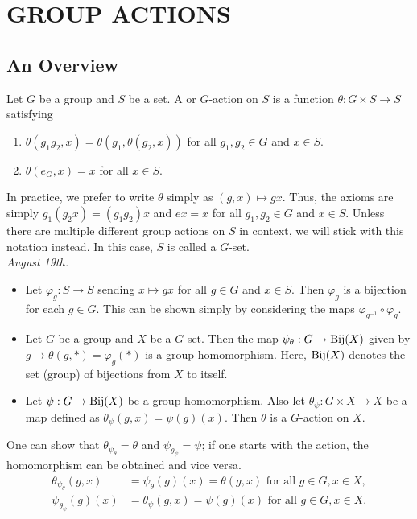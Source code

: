 \chapter{GROUP ACTIONS}

\section{An Overview}

Let $G$ be a group and $S$ be a set. A  or $G$-action on $S$ is a function $\theta : G \times S \to S$ satisfying
\begin{enumerate}
    \item $\theta(g_{1}g_{2},x) = \theta(g_{1},\theta(g_{2},x))$ for all $g_{1},g_{2} \in G$ and $x \in S$.
    \item $\theta(e_{G},x) = x$ for all $x \in S$.
\end{enumerate}
In practice, we prefer to write $\theta$ simply as $(g,x) \mapsto gx$. Thus, the axioms are simply $g_1(g_2x) = (g_1g_2)x$ and $ex = x$ for all $g_1,g_2 \in G$ and $x \in S$. Unless there are multiple different group actions on $S$ in context, we will stick with this notation instead. In this case, $S$ is called a $G$-set.\\

\textit{August 19th.}

\begin{remark}
    \begin{itemize}
        \item Let $\varphi_{g}:S \to S$ sending $x \mapsto gx$ for all $g \in G$ and $x \in S$. Then $\varphi_{g}$ is a bijection for each $g \in G$. This can be shown simply by considering the maps $\varphi_{g^{-1}} \circ \varphi_{g}$.
        \item Let $G$ be a group and $X$ be a $G$-set. Then the map $\psi_{\theta}:G \to \operatorname{Bij}(X)$ given by $g \mapsto \theta(g,\ast) = \varphi_{g}(\ast)$ is a group homomorphism. Here, $\operatorname{Bij}(X)$ denotes the set (group) of bijections from $X$ to itself.
        \item Let $\psi:G \to \operatorname{Bij}(X)$ be a group homomorphism. Also let $\theta_{\psi}:G \times X \to X$ be a map defined as $\theta_{\psi}(g,x) = \psi(g)(x)$. Then $\theta$ is a $G$-action on $X$.
    \end{itemize}
\end{remark}
One can show that $\theta_{\psi_{\theta}} = \theta$ and $\psi_{\theta_{\psi}} = \psi$; if one starts with the action, the homomorphism can be obtained and vice versa.
\begin{align}
    \theta_{\psi_{\theta}}(g,x) &= \psi_{\theta}(g)(x) = \theta(g,x) \text{ for all } g \in G, x \in X,\\
    \psi_{\theta_{\psi}}(g)(x) &= \theta_{\psi}(g,x) = \psi(g)(x) \text{ for all } g \in G, x \in X.
\end{align}

